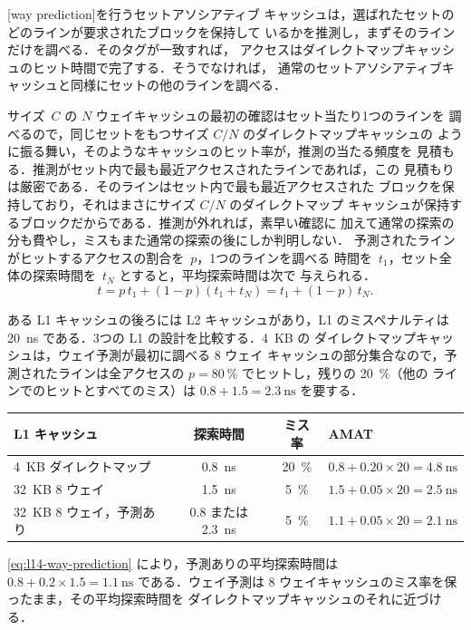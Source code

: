 \documentclass[../main.tex]{subfiles}
\begin{document}
\begin{definition}[ウェイ予測]
  [way prediction]を行うセットアソシアティブ
  キャッシュは，選ばれたセットのどのラインが要求されたブロックを保持して
  いるかを推測し，まずそのラインだけを調べる．そのタグが一致すれば，
  アクセスはダイレクトマップキャッシュのヒット時間で完了する．そうでなければ，
  通常のセットアソシアティブキャッシュと同様にセットの他のラインを調べる．
\end{definition}

サイズ~$C$ の $N$ ウェイキャッシュの最初の確認はセット当たり1つのラインを
調べるので，同じセットをもつサイズ $C/N$ のダイレクトマップキャッシュの
ように振る舞い，そのようなキャッシュのヒット率が，推測の当たる頻度を
見積もる．推測がセット内で最も最近アクセスされたラインであれば，この
見積もりは厳密である．そのラインはセット内で最も最近アクセスされた
ブロックを保持しており，それはまさにサイズ $C/N$ のダイレクトマップ
キャッシュが保持するブロックだからである．推測が外れれば，素早い確認に
加えて通常の探索の分も費やし，ミスもまた通常の探索の後にしか判明しない．
予測されたラインがヒットするアクセスの割合を~$p$，1つのラインを調べる
時間を~$t_1$，セット全体の探索時間を~$t_N$ とすると，平均探索時間は次で
与えられる．
\begin{equation}
  t = p\, t_1 + (1-p)(t_1 + t_N) = t_1 + (1-p)\, t_N .
  \label{eq:l14-way-prediction}
\end{equation}

\begin{example}
  \label{ex:l14-way-prediction}
  ある L1 キャッシュの後ろには L2 キャッシュがあり，L1 のミスペナルティは
  \SI{20}{\nano\second} である．3つの L1 の設計を比較する．4~KB の
  ダイレクトマップキャッシュは，ウェイ予測が最初に調べる 8 ウェイ
  キャッシュの部分集合なので，予測されたラインは全アクセスの
  $p = \SI{80}{\percent}$ でヒットし，残りの \SI{20}{\percent}（他の
  ラインでのヒットとすべてのミス）は $0.8 + 1.5 = \SI{2.3}{\nano\second}$
  を要する．
  \begin{center}\small
    \begin{tabular}{@{}lccl@{}}
      \toprule
      L1 キャッシュ & 探索時間 & ミス率 & AMAT \\
      \midrule
      4~KB ダイレクトマップ     & \SI{0.8}{\nano\second} & \SI{20}{\percent} & $0.8 + 0.20\times 20 = \SI{4.8}{\nano\second}$ \\
      32~KB 8 ウェイ            & \SI{1.5}{\nano\second} & \SI{5}{\percent}  & $1.5 + 0.05\times 20 = \SI{2.5}{\nano\second}$ \\
      32~KB 8 ウェイ，予測あり  & 0.8 または \SI{2.3}{\nano\second} & \SI{5}{\percent} & $1.1 + 0.05\times 20 = \SI{2.1}{\nano\second}$ \\
      \bottomrule
    \end{tabular}
  \end{center}
  \cref{eq:l14-way-prediction} により，予測ありの平均探索時間は
  $0.8 + 0.2\times 1.5 = \SI{1.1}{\nano\second}$ である．ウェイ予測は
  8 ウェイキャッシュのミス率を保ったまま，その平均探索時間を
  ダイレクトマップキャッシュのそれに近づける．
\end{example}
\end{document}
